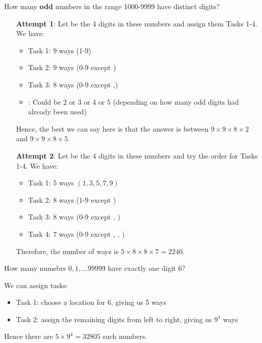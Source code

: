 \documentclass[12pt]{article}
\begin{document}
\cautiouseg How many \textbf{odd} numbers in the range 1000-9999 have distinct digits?
\begin{itemize}[align=left]
    \item[\textbf{Attempt 1}:] Let  be the 4 digits in these numbers and assign them Tasks 1-4. We have: \begin{itemize}
        \item Task 1: 9 ways (1-9)
        \item Task 2: 9 ways (0-9 except )
        \item Task 3: 8 ways (0-9 except ,)
        \item {}: Could be 2 or 3 or 4 or 5 (depending on how many odd digits had already been used)
    \end{itemize}
    Hence, the best we can say here is that the answer is between $9\times9\times8\times2$ and $9\times9\times8\times5$.

    \item[\textbf{Attempt 2}:] Let  be the 4 digits in these numbers and try the order  for Tasks 1-4. We have: \begin{itemize}
        \item Task 1: 5 ways $(1,3,5,7,9)$
        \item Task 2: 8 ways (1-9 except )
        \item Task 3: 8 ways (0-9 except , )
        \item Task 4: 7 ways (0-9 except , , )
    \end{itemize}
    Therefore, the number of ways is $5\times 8\times 8\times 7=2240$.
\end{itemize}

\eg How many numebrs $0,1,\dots 99999$ have exactly one digit 6?

We can assign tasks:\begin{itemize}
    \item Task 1: choose a location for 6, giving us 5 ways
    \item Task 2: assign the remaining digits from left to right, giving us $9^4$ ways
\end{itemize}

Hence there are $5\times 9^4=32805$ such numbers.
\end{document}
